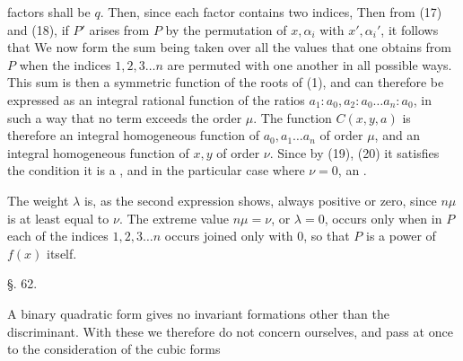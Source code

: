 factors shall be $q$. Then, since each factor contains two
indices,
Then from (17) and (18), if $P'$ arises from $P$ by the
permutation of $x, \alpha_i$ with $x', \alpha_i'$, it follows that
We now form
the sum being taken over all the values that one obtains from $P$
when the indices $1, 2, 3 \ldots n$ are permuted with one another
in all possible ways. This sum is then a symmetric function of
the roots of (1), and can therefore be expressed as an integral
rational function of the ratios $a_1 : a_0, a_2 : a_0 \ldots a_n : a_0$,
in such a way that no term exceeds the order $\mu$. The
function $C(x, y, a)$ is therefore an integral homogeneous function of
$a_0, a_1 \ldots a_n$ of order $\mu$, and an integral homogeneous
function of $x, y$ of order $\nu$. Since by (19), (20) it satisfies
the condition
it is a , and in the particular case
where $\nu = 0$, an .

The weight $\lambda$ is, as the second expression shows, always
positive or zero, since $n\mu$ is at least equal to $\nu$. The extreme
value $n\mu = \nu$, or $\lambda = 0$, occurs only when in $P$
each of the indices $1, 2, 3 \ldots n$ occurs joined only with 0,
so that $P$ is a power of $f(x)$ itself.

\begin{center}
\S. 62.

\end{center}

A binary quadratic form gives no invariant
formations other than the discriminant. With these we therefore
do not concern ourselves, and pass at once to the consideration of the
cubic forms
